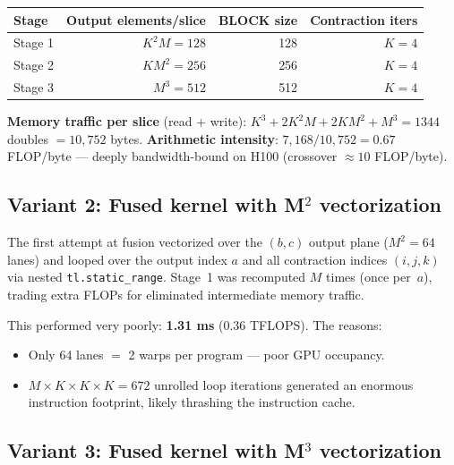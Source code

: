 \documentclass[11pt]{article}
\begin{document}
\begin{table}[H]
\centering
\begin{tabular}{lrrr}
\toprule
\textbf{Stage} & \textbf{Output elements/slice} & \textbf{BLOCK size} & \textbf{Contraction iters} \\
\midrule
Stage 1 & $K^2 M = 128$  & 128 & $K = 4$ \\
Stage 2 & $K M^2 = 256$  & 256 & $K = 4$ \\
Stage 3 & $M^3 = 512$    & 512 & $K = 4$ \\
\bottomrule
\end{tabular}
\end{table}

\textbf{Memory traffic per slice} (read + write):
$K^3 + 2 K^2 M + 2 K M^2 + M^3 = 1344$ doubles $= 10{,}752$ bytes.
\textbf{Arithmetic intensity}: $7{,}168 / 10{,}752 = 0.67$ FLOP/byte --- deeply
bandwidth-bound on H100 (crossover $\approx 10$ FLOP/byte).

\begin{center}
\end{center}

\subsection{Variant 2: Fused kernel with M\texorpdfstring{$^2$}{2} vectorization}

The first attempt at fusion vectorized over the $(b,c)$ output plane
($M^2 = 64$ lanes) and looped over the output index $a$ and all
contraction indices $(i,j,k)$ via nested \texttt{tl.static\_range}.
Stage~1 was recomputed $M$ times (once per~$a$), trading extra FLOPs
for eliminated intermediate memory traffic.

This performed very poorly: \textbf{1.31 ms} (0.36 TFLOPS).  The reasons:
\begin{itemize}
  \item Only 64 lanes $=$ 2 warps per program --- poor GPU occupancy.
  \item $M \times K \times K \times K = 672$ unrolled loop iterations
    generated an enormous instruction footprint, likely thrashing the
    instruction cache.
\end{itemize}

\subsection{Variant 3: Fused kernel with M\texorpdfstring{$^3$}{3} vectorization}
\end{document}
